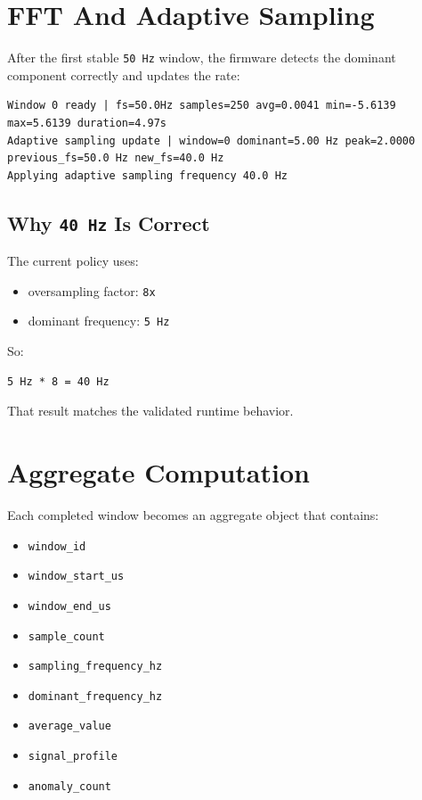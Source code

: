 \documentclass[12pt,a4paper]{article}
\begin{document}
\section{FFT And Adaptive Sampling}

After the first stable \texttt{50 Hz} window, the firmware detects the
dominant component correctly and updates the rate:

\begin{lstlisting}
Window 0 ready | fs=50.0Hz samples=250 avg=0.0041 min=-5.6139 max=5.6139 duration=4.97s
Adaptive sampling update | window=0 dominant=5.00 Hz peak=2.0000 previous_fs=50.0 Hz new_fs=40.0 Hz
Applying adaptive sampling frequency 40.0 Hz
\end{lstlisting}

\subsection{Why \texttt{40 Hz} Is Correct}

The current policy uses:

\begin{itemize}
    \item oversampling factor: \texttt{8x}
    \item dominant frequency: \texttt{5 Hz}
\end{itemize}

So:

\begin{lstlisting}
5 Hz * 8 = 40 Hz
\end{lstlisting}

That result matches the validated runtime behavior.

\section{Aggregate Computation}

Each completed window becomes an aggregate object that contains:

\begin{itemize}
    \item \texttt{window\_id}
    \item \texttt{window\_start\_us}
    \item \texttt{window\_end\_us}
    \item \texttt{sample\_count}
    \item \texttt{sampling\_frequency\_hz}
    \item \texttt{dominant\_frequency\_hz}
    \item \texttt{average\_value}
    \item \texttt{signal\_profile}
    \item \texttt{anomaly\_count}
\end{itemize}
\end{document}
